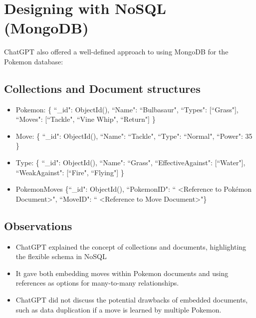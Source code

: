 \documentclass{article}
\begin{document}
\section{Designing with NoSQL (MongoDB)}
ChatGPT also offered a well-defined approach to using MongoDB for the Pokemon database:
\subsection{Collections and Document structures}
\begin{itemize}
    \item Pokemon: \{ ``\_id": ObjectId(), ``Name": ``Bulbasaur", ``Types": [``Grass"], ``Moves": [``Tackle", ``Vine Whip", ``Return"] \}
    \item Move: \{ ``\_id": ObjectId(), ``Name": ``Tackle", ``Type": ``Normal", ``Power": 35 \}
    \item Type: \{ ``\_id": ObjectId(), ``Name": ``Grass", ``EffectiveAgainst": [``Water"], ``WeakAgainst": [``Fire", ``Flying"] \}
    \item PokemonMoves \{``\_id": ObjectId(),
    ``PokemonID": `` \textless Reference to Pokémon Document\textgreater ",
    ``MoveID": `` \textless Reference to Move Document\textgreater"\}

\end{itemize}
\subsection{Observations}
\begin{itemize}
    \item ChatGPT explained the concept of collections and documents, highlighting the flexible schema in NoSQL
    \item It gave both embedding moves within Pokemon documents and using references as options for many-to-many relationships.
    \item ChatGPT did not discuss the potential drawbacks of embedded documents, such as data duplication if a move is learned by multiple Pokemon.
\end{itemize}
\end{document}
